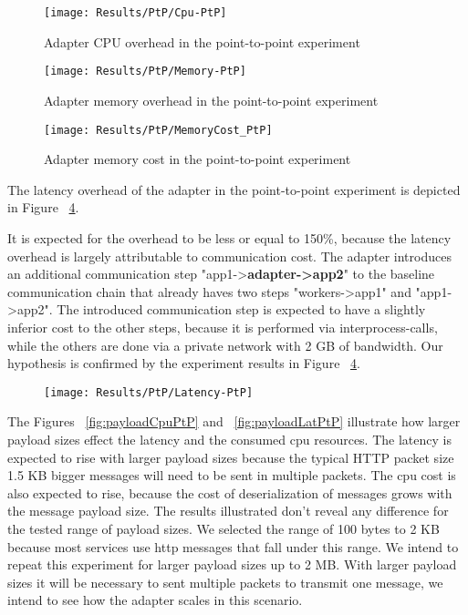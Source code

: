 \begin{figure}[htbp]
    \centering
    \texttt{[image: Results/PtP/Cpu-PtP]}
    \caption{Adapter CPU overhead in the point-to-point experiment}
    \label{fig:cpuPtp}
\end{figure}

\begin{figure}[htbp]
    \centering
    \texttt{[image: Results/PtP/Memory-PtP]}
    \caption{Adapter memory overhead in the point-to-point experiment}
    \label{fig:memPtp}
\end{figure}

\begin{figure}[htbp]
    \centering
    \texttt{[image: Results/PtP/MemoryCost\_PtP]}
    \caption{Adapter memory cost in the point-to-point experiment}
    \label{fig:memCostPtp}
\end{figure}

\newpage

The latency overhead of the adapter in the point-to-point experiment is depicted in Figure ~\ref{fig:latPtP}.

It is expected for the overhead to be less or equal to 150\%, because the latency overhead is largely attributable to communication cost.
The adapter introduces an additional communication step "app1->\textbf{adapter->app2}" to the baseline communication chain that already haves two steps "workers->app1" and "app1->app2".
The introduced communication step is expected to have a slightly inferior cost to the other steps, because it is performed via interprocess-calls, while the others are done via a private network with 2 GB of bandwidth.
Our hypothesis is confirmed by the experiment results in Figure ~\ref{fig:latPtP}.

\begin{figure}[htbp]
    \centering
    \texttt{[image: Results/PtP/Latency-PtP]}
    \label{fig:latPtP}
\end{figure}

The Figures  ~\ref{fig:payloadCpuPtP} and ~\ref{fig:payloadLatPtP} illustrate how larger payload sizes effect the latency and the consumed cpu resources.
The latency is expected to rise with larger payload sizes because the typical HTTP packet size 1.5 KB bigger messages will need to be sent in multiple packets.
The cpu cost is also expected to rise, because the cost of deserialization of messages grows with the message payload size.
The results illustrated don't reveal any difference for the tested range of payload sizes.
We selected the range of 100 bytes to 2 KB because most services use http messages that fall under this range.
We intend to repeat this experiment for larger payload sizes up to 2 MB.
With larger payload sizes it will be necessary to sent multiple packets to transmit one message, we intend to see how the adapter scales in this scenario.


